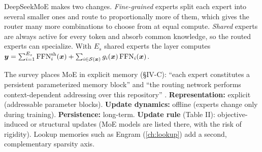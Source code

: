 DeepSeekMoE \citep{dai2024deepseekmoe} makes two changes. \emph{Fine-grained} experts split
each expert into several smaller ones and route to proportionally more of them, which gives
the router many more combinations to choose from at equal compute. \emph{Shared} experts are
always active for every token and absorb common knowledge, so the routed experts can
specialize. With $E_s$ shared experts the layer computes
$\bm{y} = \sum_{i=1}^{E_s}\mathrm{FFN}^{\mathrm{sh}}_i(\bm{x}) + \sum_{i\in\mathcal{S}(\bm{x})}
g_i(\bm{x})\,\mathrm{FFN}_i(\bm{x})$.

\begin{taxonomy}
The survey places MoE in explicit memory (\S IV-C): ``each expert constitutes a persistent
parameterized memory block'' and ``the routing network performs context-dependent
addressing over this repository'' \citep{zhoubian2026memory}.
\textbf{Representation:} explicit (addressable parameter blocks).
\textbf{Update dynamics:} offline (experts change only during training).
\textbf{Persistence:} long-term.
\textbf{Update rule} (Table II): objective-induced or structural updates (MoE models are
listed there, with the risk of rigidity). Lookup memories such as Engram (\cref{ch:lookup})
add a second, complementary sparsity axis.
\end{taxonomy}

